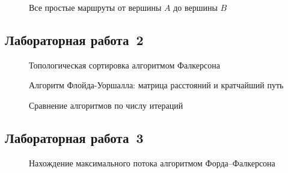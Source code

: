 \begin{figure}[h]
    \centering
    \caption{Все простые маршруты от вершины $A$ до вершины $B$}
\end{figure}

\subsection{Лабораторная работа~2}

\begin{figure}[h]
    \centering
    \caption{Топологическая сортировка алгоритмом Фалкерсона}
\end{figure}

\begin{figure}[h]
    \centering
    \caption{Алгоритм Флойда-Уоршалла: матрица расстояний и кратчайший путь}
\end{figure}

\begin{figure}[h]
    \centering
    \caption{Сравнение алгоритмов по числу итераций}
\end{figure}

\subsection{Лабораторная работа~3}

\begin{figure}[h]
    \centering
    \caption{Нахождение максимального потока алгоритмом Форда--Фалкерсона}
\end{figure}

